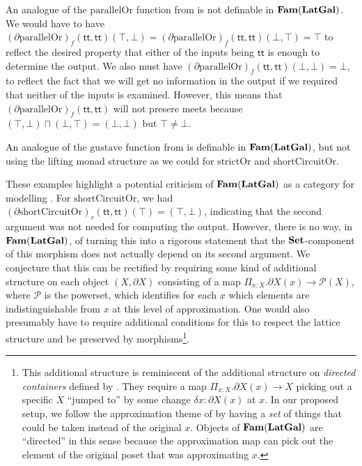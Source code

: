 An analogue of the $\mathrm{parallelOr}$ function from
 is not definable in $\mathbf{Fam}(\mathbf{LatGal})$. We would have
to have
$(\partial \mathrm{parallelOr})_f(\mathsf{tt},\mathsf{tt})(\top,\bot)
= (\partial \mathrm{parallelOr})_f(\mathsf{tt},\mathsf{tt})(\bot,\top)
= \top$ to reflect the desired property that either of the inputs
being $\mathsf{tt}$ is enough to determine the output. We also must
have
$(\partial \mathrm{parallelOr})_f(\mathsf{tt},\mathsf{tt})(\bot,\bot)
= \bot$, to reflect the fact that we will get no information in the
output if we required that neither of the inputs is examined. However,
this means that
$(\partial \mathrm{parallelOr})_f(\mathsf{tt},\mathsf{tt})$ will not
presere meets because $(\top,\bot) \sqcap (\bot,\top) = (\bot,\bot)$
but $\top \neq \bot$.

An analogue of the $\mathrm{gustave}$ function from
 is definable in $\mathbf{Fam}(\mathbf{LatGal})$, but not using the
lifting monad structure as we could for $\mathrm{strictOr}$ and
$\mathrm{shortCircuitOr}$.

\begin{remark}
  \label{rem:further-structure}
  These examples highlight a potential criticism of $\mathbf{Fam}(\mathbf{LatGal})$ as
  a category for modelling \GPS. For $\mathrm{shortCircuitOr}$, we had
  $(\partial \mathrm{shortCircuitOr})_r(\mathsf{tt},\mathsf{tt})(\top)
  = (\top, \bot)$, indicating that the second argument was not needed
  for computing the output. However, there is no way, in
  $\mathbf{Fam}(\mathbf{LatGal})$, of turning this into a rigorous statement that the
  $\mathbf{Set}$-component of this morphism does not actually depend on its
  second argument. We conjecture that this can be rectified by
  requiring some kind of additional structure on each object
  $(X, \partial X)$ consisting of a map
  $\Pi_{x : X}.\partial X(x) \to \mathcal{P}(X)$, where $\mathcal{P}$
  is the powerset, which identifies for each $x$ which elements are
  indistinguishable from $x$ at this level of approximation. One would
  also presumably have to require additional conditions for this to
  respect the lattice structure and be preserved by
  morphisms\footnote{This additional structure is reminiscent of the
    additional structure on \emph{directed containers} defined by
    \citet{ahman-chapman-uustalu2012}. They require a map
    $\Pi_{x : X}.\partial X(x) \to X$ picking out a specific $X$
    ``jumped to'' by some change $\delta x : \partial X(x)$ at $x$. In
    our proposed setup, we follow the approximation theme of \GPS by
    having a \emph{set} of things that could be taken instead of the
    original $x$. Objects of $\mathbf{Fam}(\mathbf{LatGal})$ are ``directed'' in this
    sense because the approximation map can pick out the element of
    the original poset that was approximating $x$.}.
\end{remark}

